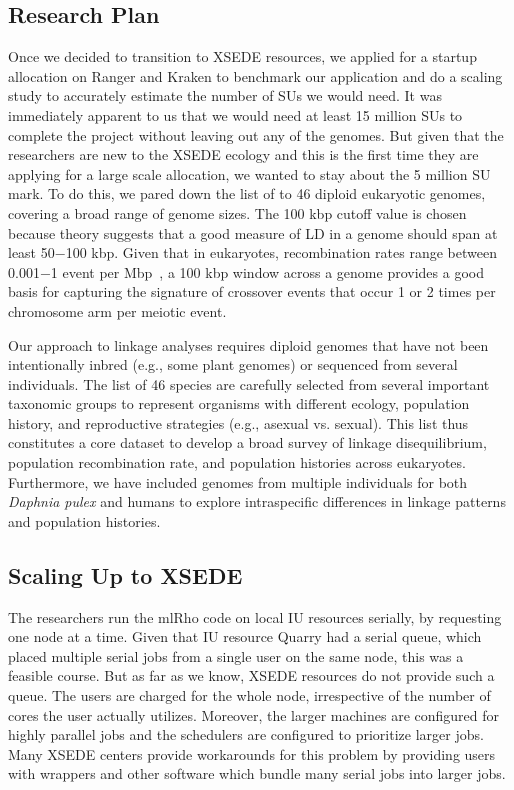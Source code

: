 \documentclass{sig-alternate}
\newcommand{\abhi}[1]{ {\textcolor{red} { ***Abhinav: #1 }}}
\newcommand{\abhi}[1]{ {}}
\begin{document}
\subsection{Research Plan}\label{sec:plan}


Once we decided to transition to XSEDE resources, we applied for a startup allocation on Ranger and Kraken to benchmark our application and do a scaling study to accurately estimate the number of SUs we would need. It was immediately apparent to us that we would need at least 15 million SUs to complete the project without leaving out any of the genomes. But given that the researchers are new to the XSEDE ecology and this is the first time they are applying for a large scale allocation, we wanted to stay about the 5 million SU mark. To do this, we pared down the list of to 46 diploid eukaryotic genomes, covering a broad range of genome sizes.
The 100 kbp cutoff value is chosen because theory suggests that a good measure
of LD in a genome should span at least 50$-$100 kbp. Given that in eukaryotes, recombination rates range
between 0.001$-$1 event per Mbp~\cite{annurev-genom-082410-101412}, a 100 kbp window across a genome provides
a good basis for capturing the signature of crossover events that occur 1 or 2 times per chromosome arm per
meiotic event.

Our approach to linkage analyses requires diploid genomes that have not been intentionally inbred  (e.g., some plant genomes) or sequenced from several individuals. The list of 46 species are carefully selected from several important taxonomic groups to represent organisms with different ecology, population history, and reproductive strategies  (e.g., asexual vs. sexual). This list  thus constitutes a core dataset to develop a broad survey of linkage disequilibrium, population recombination rate, and population histories across eukaryotes. Furthermore, we have included genomes from multiple individuals for both {\it Daphnia pulex} and humans to explore intraspecific differences in linkage patterns and population histories. 

\subsection{Scaling Up to XSEDE}
\label{sec:tests}

The researchers run the mlRho code on local IU resources serially, by requesting one node at a time. Given that IU resource Quarry had a serial queue, which placed multiple serial jobs from a single user on the same node, this was a feasible course. But as far as we know, XSEDE resources do not provide such a queue. The users are charged for the whole node, irrespective of the number of cores the user actually utilizes. Moreover, the larger machines are configured for highly parallel jobs and the schedulers are configured to prioritize larger jobs. Many XSEDE centers provide workarounds for this problem by providing users with wrappers and other software which bundle many serial jobs into larger jobs. 
\end{document}
